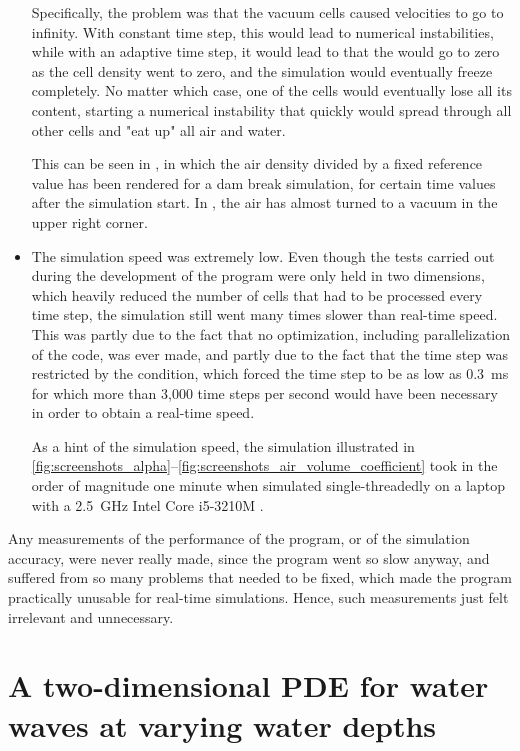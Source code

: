 \begin{itemize}
    Specifically, the problem was that the vacuum cells caused velocities to go to infinity. With constant time step, this would lead to numerical instabilities, while with an adaptive time step, it would lead to that the \timestep would go to zero as the cell density went to zero, and the simulation would eventually freeze completely. No matter which case, one of the cells would eventually lose all its content, starting a numerical instability that quickly would spread through all other cells and "eat up" all air and water.
    
    This can be seen in , in which the air density divided by a fixed reference value has been rendered for a dam break simulation, for certain time values after the simulation start. In , the air has almost turned to a vacuum in the upper right corner.
    
    \item The simulation speed was extremely low. Even though the tests carried out during the development of the program were only held in two dimensions, which heavily reduced the number of cells that had to be processed every time step, the simulation still went many times slower than real-time speed. This was partly due to the fact that no optimization, including parallelization of the code, was ever made, and partly due to the fact that the time step was restricted by the \CFL condition, which forced the time step to be as low as 0.3~ms for which more than \mbox{3,000} time steps per second would have been necessary in order to obtain a real-time speed.
    
    As a hint of the simulation speed, the simulation illustrated in \figrefs \ref{fig:screenshots_alpha}--\ref{fig:screenshots_air_volume_coefficient} took in the order of magnitude one minute when simulated single-threadedly on a laptop with a \mbox{2.5 GHz} Intel Core \mbox{i5-3210M} \CPU.
\end{itemize}

Any measurements of the performance of the program, or of the simulation accuracy, were never really made, since the program went so slow anyway, and suffered from so many problems that needed to be fixed, which made the program practically unusable for real-time simulations. Hence, such measurements just felt irrelevant and unnecessary.

\section{A two-dimensional PDE for water waves at varying water depths}

